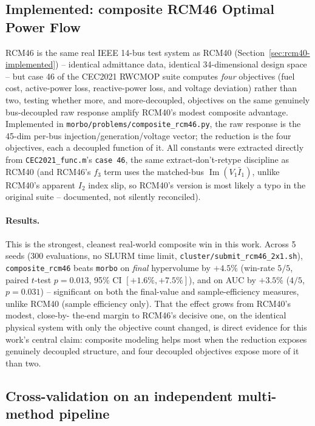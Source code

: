 \documentclass[11pt]{article}
\begin{document}
\subsection{Implemented: composite RCM46 Optimal Power Flow}
\label{sec:rcm46-implemented}

RCM46 is the same real IEEE 14-bus test system as RCM40
(Section~\ref{sec:rcm40-implemented}) -- identical admittance data,
identical 34-dimensional design space -- but case 46 of the CEC2021
RWCMOP suite \citep{kumar2021rwcmop} computes \emph{four} objectives
(fuel cost, active-power loss, reactive-power loss, and voltage
deviation) rather than two, testing whether more, and more-decoupled,
objectives on the same genuinely bus-decoupled raw response amplify
RCM40's modest composite advantage. Implemented in
\texttt{morbo/\allowbreak problems/\allowbreak composite\_rcm46.py}, the raw response is
the 45-dim per-bus injection/generation/voltage vector; the reduction is
the four objectives, each a decoupled function of it. All constants were
extracted directly from \texttt{CEC2021\_func.m}'s \texttt{case 46}, the
same extract-don't-retype discipline as RCM40 (and RCM46's $f_3$ term
uses the matched-bus $\operatorname{Im}(V_1 \bar I_1)$, unlike RCM40's
apparent $I_2$ index slip, so RCM40's version is most likely a typo in
the original suite -- documented, not silently reconciled).

\paragraph{Results.} This is the strongest, cleanest real-world
composite win in this work. Across 5 seeds (300 evaluations, no SLURM
time limit, \texttt{cluster/submit\_rcm46\_2x1.sh}), \texttt{composite\_rcm46}
beats \texttt{morbo} on \emph{final} hypervolume by $+4.5\%$ (win-rate
$5/5$, paired $t$-test $p=0.013$, 95\% CI $[+1.6\%, +7.5\%]$), and on
AUC by $+3.5\%$ ($4/5$, $p=0.031$) -- significant on both the
final-value and sample-efficiency measures, unlike RCM40 (sample
efficiency only). That the effect grows from RCM40's modest, close-by-
the-end margin to RCM46's decisive one, on the identical physical system
with only the objective count changed, is direct evidence for this
work's central claim: composite modeling helps most when the reduction
exposes genuinely decoupled structure, and four decoupled objectives
expose more of it than two.

\subsection{Cross-validation on an independent multi-method pipeline}
\label{sec:tau-crossval}
\end{document}
